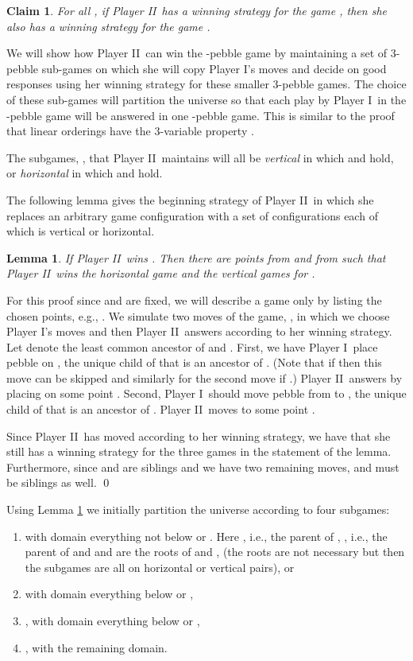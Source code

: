 \documentclass{LMCS}
\newcommand{\dupl}{Player II}
\newcommand{\spoiler}{Player I}
\theoremstyle{plain}
\newtheorem{lemma}[theorem]{Lemma}
\newtheorem{claim}[theorem]{Claim}
\theoremstyle{definition}
\begin{document}
\begin{claim}
For all , if \dupl\ has a winning strategy for the game
 , then she also has a winning
strategy for the game .
\end{claim}

We will show how \dupl\ can win the -pebble game by maintaining a
set of 3-pebble sub-games on which she will copy \spoiler's
moves and decide on good responses using her winning strategy for
these smaller 3-pebble games.   The choice of these sub-games will
partition the universe  so that each play by
\spoiler\ in the -pebble game will be answered in one -pebble
game.  This is similar to the proof that linear orderings have the
3-variable property \cite{IK}.

The subgames, , that \dupl\
maintains will all be {\em vertical} in which  and
 hold, or {\em horizontal} in which  and
 hold.

The following lemma gives the beginning strategy of \dupl\ in which she
replaces an arbitrary game configuration with a set of configurations
each of which is vertical or horizontal.

\begin{lemma}\label{Rajeev le}
If \dupl\ wins . Then there are
points  from  and  from  
such that \dupl\ wins the horizontal game
 and the vertical games
 for .
\end{lemma}

\proof
For this proof since  and  are fixed, we will 
describe a game only by listing the chosen points, 
e.g., .  We simulate two moves of the
  game, , in which we choose
  \spoiler's moves and then \dupl\ answers according to her winning
  strategy.  Let  denote the least common ancestor of  and
  . First, we have \spoiler\ place pebble  on , the
  unique child of  that is an ancestor of .  (Note that
  if  then this move can be skipped and similarly for the
  second move if .)  \dupl\ answers by placing  on
  some point .  Second, \spoiler\ should move pebble  from 
  to , the unique child of  that is an ancestor of
  .  \dupl\ moves  to some point .

Since \dupl\ has
moved according to her winning strategy, we have that she still has a
winning strategy for the three games in the statement of the lemma.
Furthermore, since  and  are siblings and we have two
remaining moves,  and  must be siblings as well.
\qed 

Using Lemma \ref{Rajeev le} we initially partition the universe
according to four subgames:
\begin{enumerate}[]
\item   with domain everything not below  or
  . Here , i.e., the parent of ,
  , i.e., the parent of  and  and  are
  the roots of  and , (the roots are not necessary but then
  the subgames are all on horizontal or vertical pairs), or
\item   with domain everything below  or ,
\item  , with domain everything below  or
  , 
\item  , with the remaining domain.
\end{enumerate}
\end{document}
